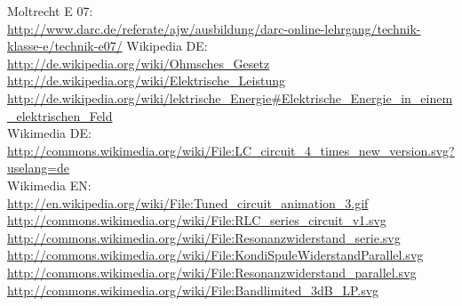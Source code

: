 \begin{thebibliography}{}
       Moltrecht E 07: \\
                    \url{http://www.darc.de/referate/ajw/ausbildung/darc-online-lehrgang/technik-klasse-e/technik-e07/}
        Wikipedia DE: \\
                    \url{http://de.wikipedia.org/wiki/Ohmsches_Gesetz}\\ 
                    \url{http://de.wikipedia.org/wiki/Elektrische_Leistung}\\ 
                    \url{http://de.wikipedia.org/wiki/lektrische_Energie#Elektrische_Energie_in_einem_elektrischen_Feld}\\ 
    	Wikimedia DE:\\
    				\url{http://commons.wikimedia.org/wiki/File:LC_circuit_4_times_new_version.svg?uselang=de}\\
   		Wikimedia EN:\\
   					\url{http://en.wikipedia.org/wiki/File:Tuned_circuit_animation_3.gif}\\
   					\url{http://commons.wikimedia.org/wiki/File:RLC_series_circuit_v1.svg}\\
   					\url{http://commons.wikimedia.org/wiki/File:Resonanzwiderstand_serie.svg}\\
   					\url{http://commons.wikimedia.org/wiki/File:KondiSpuleWiderstandParallel.svg}\\
   					\url{http://commons.wikimedia.org/wiki/File:Resonanzwiderstand_parallel.svg}\\
   					\url{http://commons.wikimedia.org/wiki/File:Bandlimited_3dB_LP.svg}\\
   					
\end{thebibliography}


